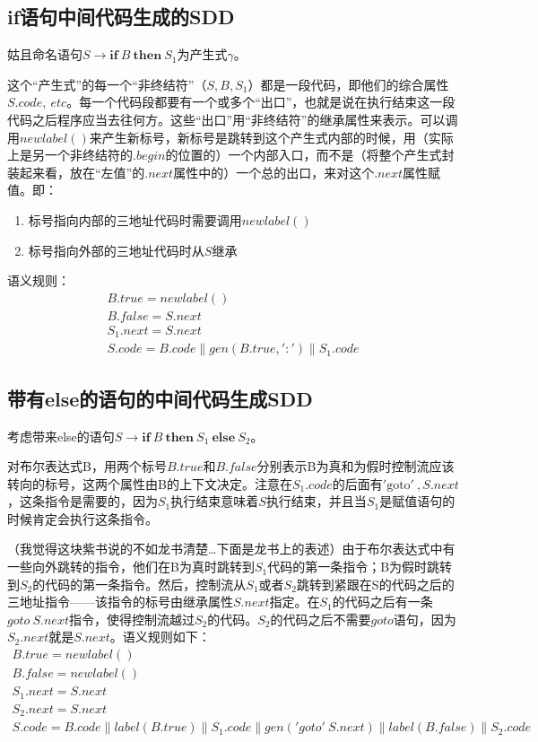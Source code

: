 \documentclass[]{report}
\begin{document}
		\subsection{if语句中间代码生成的SDD}
			姑且命名语句$S\to\mathbf{if}\ B\ \mathbf{then}\ S_1$为产生式$\gamma$。\par
			这个“产生式”的每一个“非终结符”（$S,B,S_1$）都是一段代码，即他们的综合属性$S.code,\ etc$。每一个代码段都要有一个或多个“出口”，也就是说在执行结束这一段代码之后程序应当去往何方。这些“出口”用“非终结符”的继承属性来表示。可以调用$newlabel()$来产生新标号，新标号是跳转到这个产生式内部的时候，用（实际上是另一个非终结符的$.begin$的位置的）一个内部入口，而不是（将整个产生式封装起来看，放在“左值”的$.next$属性中的）一个总的出口，来对这个$.next$属性赋值。即：
			\begin{enumerate}
				\item 标号指向内部的三地址代码时需要调用$newlabel()$
				\item 标号指向外部的三地址代码时从$S$继承
			\end{enumerate}\par
			语义规则：
			\[\begin{gathered}
				B.true=newlabel()\\
				B.false=S.next\\
				S_1.next=S.next\\
				S.code=B.code\parallel gen(B.true,':')\parallel S_1.code
			\end{gathered}\]
		\subsection{带有else的语句的中间代码生成SDD}
			考虑带来else的语句$S\to\mathbf{if}\ B\ \mathbf{then}\ S_1\ \mathbf{else}\ S_2$。\par
			对布尔表达式B，用两个标号$B.true$和$B.false$分别表示B为真和为假时控制流应该转向的标号，这两个属性由B的上下文决定。注意在$S_1.code$的后面有$\mathrm{'goto'}\ ,S.next$，这条指令是需要的，因为$S_1$执行结束意味着$S$执行结束，并且当$S_1$是赋值语句的时候肯定会执行这条指令。\par
			（我觉得这块紫书说的不如龙书清楚…下面是龙书上的表述）由于布尔表达式中有一些向外跳转的指令，他们在B为真时跳转到$S_1$代码的第一条指令；B为假时跳转到$S_2$的代码的第一条指令。然后，控制流从$S_1$或者$S_2$跳转到紧跟在S的代码之后的三地址指令——该指令的标号由继承属性$S.next$指定。在$S_1$的代码之后有一条$goto\ S.next$指令，使得控制流越过$S_2$的代码。$S_2$的代码之后不需要$goto$语句，因为$S_2.next$就是$S.next$。语义规则如下：
			\[\begin{gathered}
				B.true = newlabel()\\
				B.false = newlabel()\\
				S_1.next = S.next\\
				S_2.next = S.next\\
				S.code = B.code\parallel label(B.true)\parallel S_1.code\parallel gen('goto'\ S.next)\parallel label(B.false)\parallel S_2.code
			\end{gathered}\]
\end{document}
